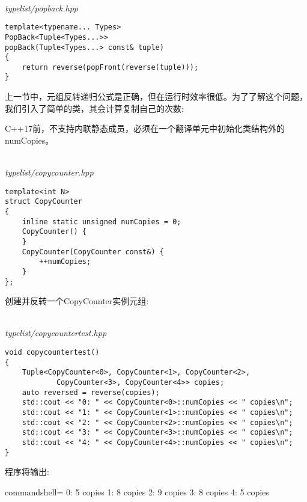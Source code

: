\hspace*{\fill} \\ %
\noindent
\textit{typelist/popback.hpp}
\begin{lstlisting}[style=styleCXX]
template<typename... Types>
PopBack<Tuple<Types...>>
popBack(Tuple<Types...> const& tuple)
{
	return reverse(popFront(reverse(tuple)));
}
\end{lstlisting}


上一节中，元组反转递归公式是正确，但在运行时效率很低。为了了解这个问题，我们引入了简单的类，其会计算复制自己的次数:

\begin{tcolorbox}[colback=webgreen!5!white,colframe=webgreen!75!black]
\hspace*{0.75cm}C++17前，不支持内联静态成员，必须在一个翻译单元中初始化类结构外的numCopies。
\end{tcolorbox}

\hspace*{\fill} \\ %
\noindent
\textit{typelist/copycounter.hpp}
\begin{lstlisting}[style=styleCXX]
template<int N>
struct CopyCounter
{
	inline static unsigned numCopies = 0;
	CopyCounter() {
	}
	CopyCounter(CopyCounter const&) {
		++numCopies;
	}
};
\end{lstlisting}

创建并反转一个CopyCounter实例元组:

\hspace*{\fill} \\ %
\noindent
\textit{typelist/copycountertest.hpp}
\begin{lstlisting}[style=styleCXX]
void copycountertest()
{
	Tuple<CopyCounter<0>, CopyCounter<1>, CopyCounter<2>,
			CopyCounter<3>, CopyCounter<4>> copies;
	auto reversed = reverse(copies);
	std::cout << "0: " << CopyCounter<0>::numCopies << " copies\n";
	std::cout << "1: " << CopyCounter<1>::numCopies << " copies\n";
	std::cout << "2: " << CopyCounter<2>::numCopies << " copies\n";
	std::cout << "3: " << CopyCounter<3>::numCopies << " copies\n";
	std::cout << "4: " << CopyCounter<4>::numCopies << " copies\n";
}
\end{lstlisting}

程序将输出:

\begin{tcblisting}{commandshell={}}
0: 5 copies
1: 8 copies
2: 9 copies
3: 8 copies
4: 5 copies
\end{tcblisting}

